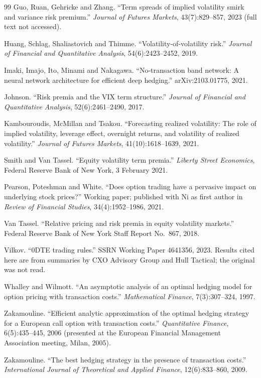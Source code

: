 \documentclass[10pt, a4paper, twocolumn]{article}
\begin{document}
\begin{thebibliography}{99}
Guo, Ruan, Gehricke and Zhang.
\newblock ``Term spreads of implied volatility smirk and variance risk premium.''
\newblock \textit{Journal of Futures Markets}, 43(7):829--857, 2023 (full text not accessed).

Huang, Schlag, Shaliastovich and Thimme.
\newblock ``Volatility-of-volatility risk.''
\newblock \textit{Journal of Financial and Quantitative Analysis}, 54(6):2423--2452, 2019.

Imaki, Imajo, Ito, Minami and Nakagawa.
\newblock ``No-transaction band network: A neural network architecture for efficient deep hedging.''
\newblock arXiv:2103.01775, 2021.

Johnson.
\newblock ``Risk premia and the VIX term structure.''
\newblock \textit{Journal of Financial and Quantitative Analysis}, 52(6):2461--2490, 2017.

Kambouroudis, McMillan and Tsakou.
\newblock ``Forecasting realized volatility: The role of implied volatility, leverage effect, overnight returns, and volatility of realized volatility.''
\newblock \textit{Journal of Futures Markets}, 41(10):1618--1639, 2021.

Smith and Van Tassel.
\newblock ``Equity volatility term premia.''
\newblock \textit{Liberty Street Economics}, Federal Reserve Bank of New York, 3 February 2021.

Pearson, Poteshman and White.
\newblock ``Does option trading have a pervasive impact on underlying stock prices?''
\newblock Working paper; published with Ni as first author in \textit{Review of Financial Studies}, 34(4):1952--1986, 2021.

Van Tassel.
\newblock ``Relative pricing and risk premia in equity volatility markets.''
\newblock Federal Reserve Bank of New York Staff Report No.~867, 2018.

Vilkov.
\newblock ``0DTE trading rules.''
\newblock SSRN Working Paper 4641356, 2023. Results cited here are from summaries by CXO Advisory Group and Hull Tactical; the original was not read.

Whalley and Wilmott.
\newblock ``An asymptotic analysis of an optimal hedging model for option pricing with transaction costs.''
\newblock \textit{Mathematical Finance}, 7(3):307--324, 1997.

Zakamouline.
\newblock ``Efficient analytic approximation of the optimal hedging strategy for a European call option with transaction costs.''
\newblock \textit{Quantitative Finance}, 6(5):435--445, 2006 (presented at the European Financial Management Association meeting, Milan, 2005).

Zakamouline.
\newblock ``The best hedging strategy in the presence of transaction costs.''
\newblock \textit{International Journal of Theoretical and Applied Finance}, 12(6):833--860, 2009.

\end{thebibliography}
\end{document}
